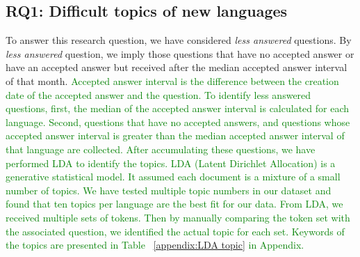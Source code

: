 \subsection{RQ1: Difficult topics of new languages}
\label{RQ1}

To answer this research question, we have considered \emph{less answered} questions. By \emph{less answered} question, we imply those questions that have no accepted answer or have an accepted answer but received after the median accepted answer interval of that month. \textcolor{green}{Accepted answer interval is the difference between the creation date of the accepted answer and the question. To identify less answered questions, first, the median of the accepted answer interval is calculated for each language. Second, questions that have no accepted answers, and questions whose accepted answer interval is greater than the median accepted answer interval of that language are collected. After accumulating these questions, we have performed LDA to identify the topics. LDA (Latent Dirichlet Allocation) is a generative statistical model. It assumed each document is a mixture of a small number of topics. We have tested multiple topic numbers in our dataset and found that ten topics per language are the best fit for our data. From LDA, we received multiple sets of tokens. Then by manually comparing the token set with the associated question, we identified the actual topic for each set. Keywords of the topics are presented in 
Table ~\ref{appendix:LDA topic} in Appendix.}
 
